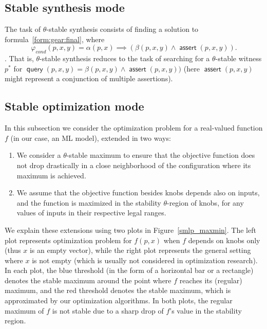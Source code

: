 \documentclass[a4paper,parskip=half]{article} %
\newcommand\changed[1]{{\color{blue}#1}}
\newcommand*\eqdef=
\newcommand*\query{\operatorname{\mathsf{query}}}
\newcommand*\assert{\operatorname{\mathsf{assert}}}
\newcommand{\delete}[1]{}
\begin{document}
\subsection{Stable synthesis mode}


The task of $\theta$-stable synthesis consists of finding a solution to formula~\cref{form:gear:final}, where
\[\varphi_{\mathit{cond}}(p,x,y) \eqdef \alpha(p,x) \implies (\beta(p, x, y) \wedge \assert(p,x,y)).\].
That is,  $\theta$-stable synthesis reduces to the task of searching for a $\theta$-stable witness $p^*$ for
$\query(p, x, y) \eqdef \beta(p, x, y) \wedge \assert(p,x,y))$ (here $\assert(p, x, y)$ might represent a conjunction of multiple assertions).



\subsection{Stable optimization mode}\label{sec:stable:opt}

In this subsection we consider the optimization problem for a real-valued function $f$ (in our case, an ML model),
extended in two ways:
\begin{enumerate}
\item We consider a $\theta$-stable maximum to ensure that the objective function  does not drop drastically in a 
close neighborhood of the configuration where its maximum is achieved.
\item We assume that the objective function besides knobs depends also on inputs, and the %
function is maximized in the stability $\theta$-region of knobs, for any values of inputs in their respective legal ranges.
\end{enumerate}
We explain these extensions using two plots in Figure~\ref{smlp_maxmin}.
The left plot represents optimization problem for $f(p,x)$ when $f$ depends on knobs only (thus $x$ is an empty vector), 
while the right plot represents the general setting where $x$ is not empty (which is usually not considered in optimization research). 
In each plot, the blue threshold (in the form of a horizontal bar or a rectangle) denotes the stable maximum around the point 
where $f$ reaches its (regular) maximum, and the red threshold denotes the stable maximum, which is approximated by our 
optimization algorithms. In both plots, the regular maximum of $f$ is not stable due to a sharp drop of $f$'s value in the stability region. 
\delete{The right plot depicts the situation when input $x$ ranges in interval $[a, b]$, thus in \emph{max-min} optimization problem, 
formalized below in Formulas~\eqref{form:opt1}  and  \eqref{form:opt2}, the minimum of $f$ is calculated in the stability region 
of knobs $p$, with values of $x$ ranging in $[a,b]$.}
\end{document}
